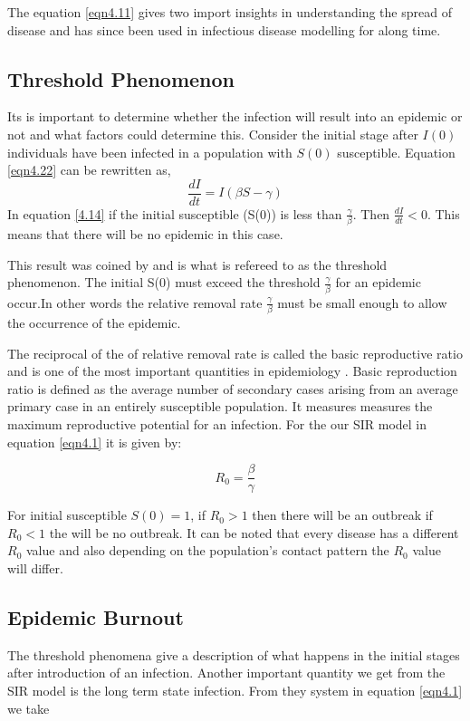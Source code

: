 The equation \ref{eqn4.11} gives two import insights in understanding the spread of disease and has since been used in infectious disease modelling for along time.

\subsection{Threshold Phenomenon} 
Its is important to determine whether the infection will result into an epidemic or not and what factors could determine this. Consider the initial stage after $I(0)$ individuals have been infected in a population with $S(0)$ susceptible. Equation \ref{eqn4.22} can be rewritten as,
\begin{equation} 
\frac{dI}{dt} = I \left(\beta S -\gamma \right)\label{4.14}
\end{equation}
In equation \ref{4.14} if the initial susceptible (S(0)) is less than $\frac{\gamma}{\beta}$. Then $\frac{dI}{dt} < 0.$ This means that there will be no epidemic in this case.

This result was coined by \cite{m1925applications} and  is what is refereed to as the threshold phenomenon. The initial S(0) must exceed the threshold $\frac{\gamma}{\beta}$ for an epidemic occur.In  other words the relative removal rate $\frac{\gamma}{\beta}$ must be small enough to allow the occurrence  of the epidemic.
 
 The reciprocal of the of relative removal rate is called the basic reproductive ratio and is one of the most important quantities in epidemiology . Basic reproduction ratio is defined as the average number of secondary cases arising from an average primary case in an entirely susceptible population. It measures measures the maximum reproductive potential for an infection. For the our SIR model in equation \ref{eqn4.1} it is given by:

\begin{equation}
R_0 = \frac{\beta}{\gamma}\label{eqn 4.15}
\end{equation}
 
For initial susceptible $S(0) = 1$, if $R_0 >1$ then there will be an outbreak if $R_0<1$ the will be no outbreak. It can be noted that every disease has a different $R_0$ value and also depending on the population's contact pattern the $R_0$ value will differ.

 \subsection{Epidemic Burnout}
 The threshold phenomena give a description of what happens in the initial stages after introduction of an infection. Another important quantity we get from the SIR model is the long term state infection. From they system in equation \ref{eqn4.1} we take
 
